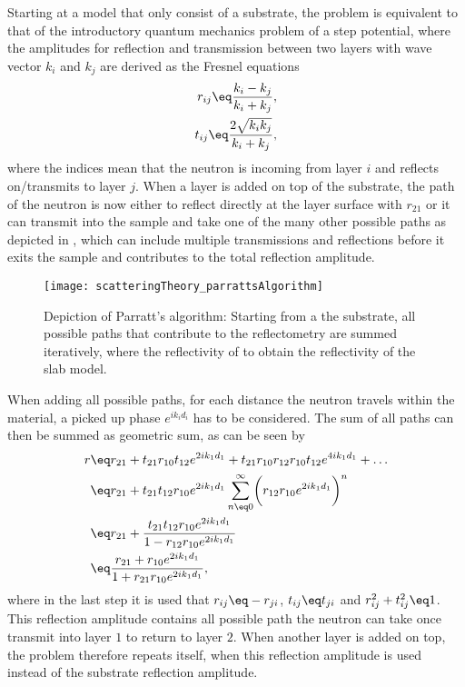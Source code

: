 \documentclass[\main/dresen_thesis.tex]{subfiles}
\begin{document}
    Starting at a model that only consist of a substrate, the problem is equivalent to that of the introductory quantum mechanics problem of a step potential, where the amplitudes for reflection and transmission between two layers with wave vector $k_i$ and $k_j$ are derived as the Fresnel equations
    \begin{align}
      r_{ij} \eq \frac{k_i - k_j}{k_i+k_j},\\
      t_{ij} \eq \frac{2 \sqrt{k_i k_j}}{k_i+k_j},
    \end{align}
    where the indices mean that the neutron is incoming from layer $i$ and reflects on/transmits to layer $j$.
    When a layer is added on top of the substrate, the path of the neutron is now either to reflect directly at the layer surface with $r_{21}$ or it can transmit into the sample and take one of the many other possible paths as depicted in , which can include multiple transmissions and reflections before it exits the sample and contributes to the total reflection amplitude.
    \begin{figure}
      \centering
      \texttt{[image: scatteringTheory\_parrattsAlgorithm]}
      \caption{\label{fig:theoreticalBackground:scattering:reflectometry:parratt}Depiction of Parratt's algorithm: Starting from a the substrate, all possible paths that contribute to the reflectometry are summed iteratively, where the reflectivity of  to obtain the reflectivity of the slab model.}
    \end{figure}
    When adding all possible paths, for each distance the neutron travels within the material, a picked up phase $e^{i k_i d_i}$ has to be considered.
    The sum of all paths can then be summed as geometric sum, as can be seen by
    \begin{align}
      \begin{split}
        r &\eq r_{21} + t_{21} r_{10} t_{12} e^{2 i k_1 d_1} + t_{21} r_{10} r_{12} r_{10} t_{12} e^{4 i k_1 d_1} + \ldots\\
        &\eq r_{21} + t_{21} t_{12} r_{10} e^{2 i k_1 d_1} \sum_{n\eq0}^\infty \biggl(r_{12} r_{10} e^{2 i k_1 d_1}\biggr)^n\\
        &\eq r_{21} + \frac{t_{21} t_{12} r_{10} e^{2 i k_1 d_1}} {1 - r_{12} r_{10} e^{2 i k_1 d_1}}\\
        &\eq \frac{r_{21} + r_{10} e^{2 i k_1 d_1}} {1 + r_{21} r_{10} e^{2 i k_1 d_1}},
      \end{split}
    \end{align}
    where in the last step it is used that $r_{ij} \eq -r_{ji}$, $t_{ij} \eq t_{ji}$ and $r_{ij}^2 + t_{ij}^2 \eq 1$.
    This reflection amplitude contains all possible path the neutron can take once transmit into layer $1$ to return to layer $2$.
    When another layer is added on top, the problem therefore repeats itself, when this reflection amplitude is used instead of the substrate reflection amplitude.
\end{document}
